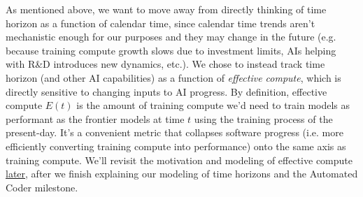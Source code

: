 \documentclass{article}
\theoremstyle{definition}
\newcommand{\ASUG}[1]{\textcolor{magenta}{ALEX-SUGGESTION: #1}}
\begin{document}


As mentioned above, we want to move away from directly thinking of time horizon as a function of calendar time, since calendar time trends aren't mechanistic enough for our purposes and they may change in the future (e.g. because training compute growth slows due to investment limits, AIs helping with R\&D introduces new dynamics, etc.). We chose to instead track time horizon (and other AI capabilities) as a function of \textit{effective compute}, which is directly sensitive to changing inputs to AI progress. By definition, effective compute $E(t)$ is the amount of training compute we'd need to train models as performant as the frontier models at time $t$ using the training process of the present-day. It's a convenient metric that collapses software progress (i.e. more efficiently converting training compute into performance) onto the same axis as training compute. We'll revisit the motivation and modeling of effective compute \hyperref[Effective compute]{later}, after we finish explaining our modeling of time horizons and the Automated Coder milestone.


\end{document}
